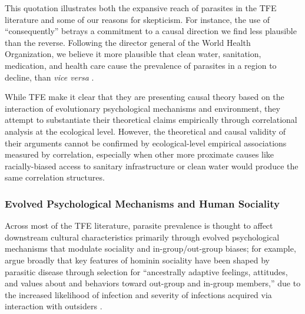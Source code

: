 \documentclass[12pt]{article}
\begin{document}
This quotation illustrates both the expansive reach of parasites in the TFE literature and some of our reasons for skepticism.  For instance, the use of ``consequently'' betrays a commitment to a causal direction we find less plausible than the reverse.  Following the director general of the World Health Organization, we believe it more plausible  that clean water, sanitation, medication, and health care cause the prevalence of parasites in a region to decline, than \textit{vice versa} \citep{Jongwook2004}.
 
 	While TFE make it clear that they are presenting causal theory based on the interaction of evolutionary psychological mechanisms and environment, they attempt to substantiate their theoretical claims empirically through correlational analysis at the ecological level.  However, the theoretical and causal validity of their arguments cannot be confirmed by ecological-level empirical associations measured by correlation, especially when other more proximate causes like racially-biased access to sanitary infrastructure or clean water would produce the same correlation structures.
 	
\subsubsection{Evolved Psychological Mechanisms and Human Sociality}
Across most of the TFE literature, parasite prevalence is thought to affect downstream cultural characteristics primarily through evolved psychological mechanisms that modulate sociality and in-group/out-group biases; for example, \citet{Fincher2012} argue broadly that key features of hominin sociality have been shaped by parasitic disease through selection for ``ancestrally adaptive feelings, attitudes, and values about and behaviors toward out-group and in-group members,'' due to the increased likelihood of infection and severity of infections acquired via interaction with outsiders \citep[pg60]{Fincher2012}. 
\end{document}

